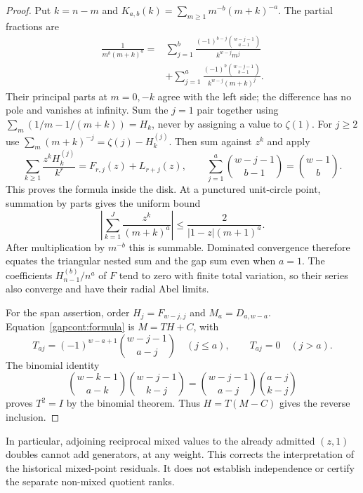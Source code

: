 \begin{proof}
Put $k=n-m$ and $K_{a,b}(k)=\sum_{m\ge1}m^{-b}(m+k)^{-a}$. The partial fractions are
\begin{align*}
\frac1{m^b(m+k)^a}
={}&\sum_{j=1}^{b}\frac{(-1)^{b-j}\binom{w-j-1}{a-1}}{k^{w-j}m^j}\\
&+\sum_{j=1}^{a}\frac{(-1)^b\binom{w-j-1}{b-1}}{k^{w-j}(m+k)^j}.
\end{align*}
Their principal parts at $m=0,-k$ agree with the left side; the difference
has no pole and vanishes at infinity. Sum the $j=1$ pair together using
$\sum_m(1/m-1/(m+k))=H_k$, never by assigning a value to $\zeta(1)$.
For $j\ge2$ use $\sum_m(m+k)^{-j}=\zeta(j)-H_k^{(j)}$. Then sum against $z^k$ and apply
\[
\sum_{k\ge1}\frac{z^k H_k^{(j)}}{k^r}=F_{r,j}(z)+L_{r+j}(z),\qquad
\sum_{j=1}^{a}\binom{w-j-1}{b-1}=\binom{w-1}{b}.
\]
This proves the formula inside the disk. At a punctured unit-circle point,
summation by parts gives the uniform bound
\[
\left|\sum_{k=1}^{J}\frac{z^k}{(m+k)^a}\right|
\le\frac{2}{|1-z|(m+1)^a}.
\]
After multiplication by $m^{-b}$ this is summable. Dominated convergence
therefore equates the triangular nested sum and the gap sum even when $a=1$.
The coefficients $H_{n-1}^{(b)}/n^a$ of $F$ tend to zero with finite total
variation, so their series also converge and have their radial Abel limits.

For the span assertion, order $H_j=F_{w-j,j}$ and $M_a=D_{a,w-a}$.
Equation~\eqref{gapcont:formula} is $M=TH+C$, with
\[
T_{aj}=(-1)^{w-a+1}\binom{w-j-1}{a-j}\quad(j\le a),\qquad T_{aj}=0\quad(j>a).
\]
The binomial identity
\[
\binom{w-k-1}{a-k}\binom{w-j-1}{k-j}
=\binom{w-j-1}{a-j}\binom{a-j}{k-j}
\]
proves $T^2=I$ by the binomial theorem. Thus $H=T(M-C)$ gives the reverse inclusion.
\end{proof}

In particular, adjoining reciprocal mixed values to the already admitted
$(z,1)$ doubles cannot add generators, at any weight. This corrects the
interpretation of the historical mixed-point residuals. It does not establish
independence or certify the separate non-mixed quotient ranks.

